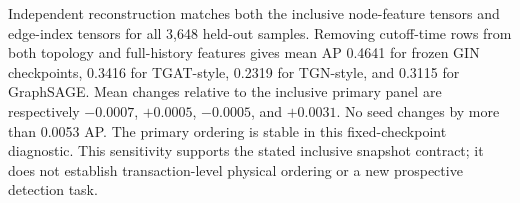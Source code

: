 Independent reconstruction matches both the inclusive node-feature tensors and edge-index tensors for all 3,648 held-out samples. Removing cutoff-time rows from both topology and full-history features gives mean AP 0.4641 for frozen GIN checkpoints, 0.3416 for TGAT-style, 0.2319 for TGN-style, and 0.3115 for GraphSAGE. Mean changes relative to the inclusive primary panel are respectively $-0.0007$, $+0.0005$, $-0.0005$, and $+0.0031$. No seed changes by more than 0.0053 AP. The primary ordering is stable in this fixed-checkpoint diagnostic. This sensitivity supports the stated inclusive snapshot contract; it does not establish transaction-level physical ordering or a new prospective detection task.
